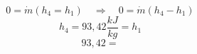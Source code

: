 

\item[(c)] 
    \begin{equation*}
        0 = \dot{m} (h_4 = h_1) \quad \Rightarrow \quad 0 = \dot{m} (h_4 - h_1)
    \end{equation*}
    \begin{equation*}
        h_4 = 93,42 \frac{kJ}{kg} = h_1
    \end{equation*}
    \begin{equation*}
        93,42 =
    \end{equation*}